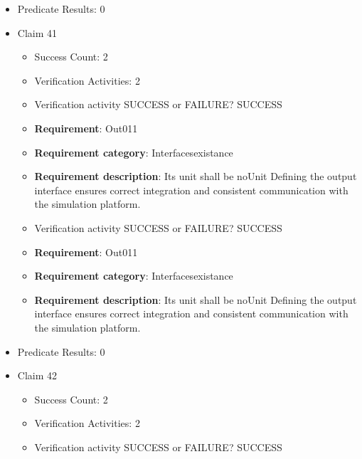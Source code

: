 \documentclass{article}
\begin{document}
\begin{itemize}
\begin{itemize}
					\item Verification activity SUCCESS or FAILURE? SUCCESS
		
						\item \textbf{Requirement}: Out010 
						\item \textbf{Requirement category}: Interfacesexistance 
						\item \textbf{Requirement description}: Its unit shall be Nm Defining the output interface ensures correct integration and consistent communication with the simulation platform.
					
				\end{itemize}
				
									    
				\item Predicate Results: 0

  				  \item Claim 41
				\begin{itemize}
			    	\item Success Count: 2 
			    	\item Verification Activities: 2
					\item Verification activity SUCCESS or FAILURE? SUCCESS
		
						\item \textbf{Requirement}: Out011 
						\item \textbf{Requirement category}: Interfacesexistance 
						\item \textbf{Requirement description}: Its unit shall be noUnit Defining the output interface ensures correct integration and consistent communication with the simulation platform.
					
					\item Verification activity SUCCESS or FAILURE? SUCCESS
		
						\item \textbf{Requirement}: Out011 
						\item \textbf{Requirement category}: Interfacesexistance 
						\item \textbf{Requirement description}: Its unit shall be noUnit Defining the output interface ensures correct integration and consistent communication with the simulation platform.
					
				\end{itemize}
				
									    
				\item Predicate Results: 0

  				  \item Claim 42
				\begin{itemize}
			    	\item Success Count: 2 
			    	\item Verification Activities: 2
					\item Verification activity SUCCESS or FAILURE? SUCCESS
		

\end{itemize}
\end{itemize}
\end{document}
